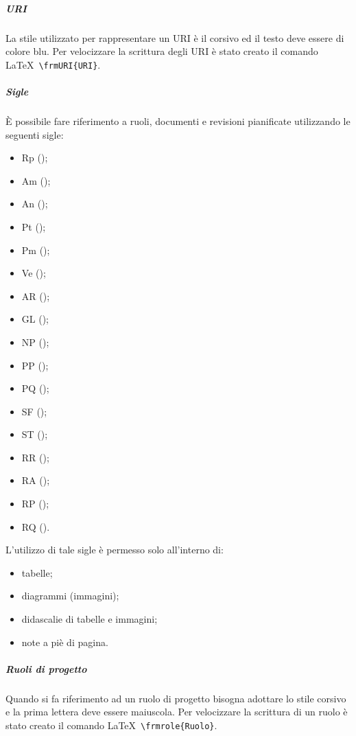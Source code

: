 \documentclass[../NormeProgetto.text]{subfiles}
\begin{document}
			\subparagraph{URI}
				La stile utilizzato per rappresentare un URI è il corsivo ed il testo deve essere di colore blu. Per velocizzare la scrittura degli URI è stato creato il comando \LaTeX\ \texttt{\textbackslash frmURI\{URI\}}.
			 
			\subparagraph{Sigle}
				È possibile fare riferimento a ruoli, documenti e revisioni pianificate utilizzando le seguenti sigle:
				\begin{itemize}
					\item Rp (\responsabilediprogetto);
					\item Am (\amministratore);
					\item An (\analista);
					\item Pt (\progettista);
					\item Pm (\programmatore);
					\item Ve (\verificatore);
					
					\item AR (\analisideirequisiti);
					\item GL (\glossario);
					\item NP (\normediprogetto);
					\item PP (\pianodiprogetto);
					\item PQ (\pianodiqualifica);
					\item SF (\studiodifattibilita);
					\item ST (\specificatecnica);
					
					\item RR (\revisionedeirequisiti);
					\item RA (\revisionediaccettazione);
					\item RP (\revisionediprogettazione);
					\item RQ (\revisionediqualifica).
				\end{itemize}
				L'utilizzo di tale sigle è permesso solo all'interno di:
				\begin{itemize}
					\item tabelle;
					\item diagrammi (immagini);
					\item didascalie di tabelle e immagini;
					\item note a piè di pagina.
				\end{itemize}
			\subparagraph{Ruoli di progetto}
				Quando si fa riferimento ad un ruolo di progetto bisogna adottare lo stile corsivo e la prima lettera deve essere maiuscola. 	 Per velocizzare la scrittura di un ruolo è stato creato il comando \LaTeX\ \texttt{\textbackslash frmrole\{Ruolo\}}. 
			
\end{document}
